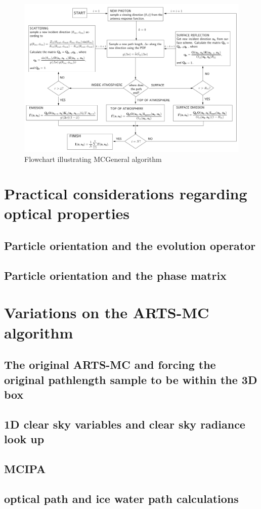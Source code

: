 \begin{figure}
\begin{center}
\includegraphics[width=\vsize,angle=90]{flowchart2}
\caption{Flowchart illustrating MCGeneral algorithm}
\end{center}
\label{fig:montecarlo:flowchart}
\end{figure}

\section{Practical considerations regarding optical properties}
\subsection{Particle orientation and the evolution operator}
\subsection{Particle orientation and the phase matrix}
\section{Variations on the ARTS-MC algorithm}
\subsection{The original ARTS-MC and forcing the original pathlength sample to be within the 3D box} 
\subsection{1D clear sky variables and clear sky radiance look up} 
\subsection{MCIPA}
\subsection{optical path and ice water path calculations}



